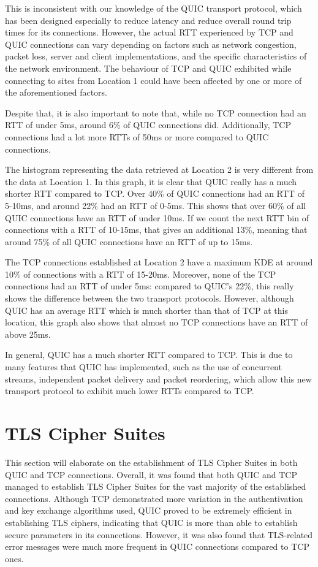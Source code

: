 \documentclass{l4proj}
\begin{document}
This is inconsistent with our knowledge of the QUIC transport protocol, which has been designed especially to reduce latency and reduce overall round trip times for its connections. However, the actual RTT experienced by TCP and QUIC connections can vary depending on factors such as network congestion, packet loss, server and client implementations, and the specific characteristics of the network environment. The behaviour of TCP and QUIC exhibited while connecting to sites from Location 1 could have been affected by one or more of the aforementioned factors.

Despite that, it is also important to note that, while no TCP connection had an RTT of under 5ms, around 6\% of QUIC connections did. Additionally, TCP connections had a lot more RTTs of 50ms or more compared to QUIC connections.

The histogram representing the data retrieved at Location 2 is very different from the data at Location 1. In this graph, it is clear that QUIC really has a much shorter RTT compared to TCP. Over 40\% of QUIC connections had an RTT of 5-10ms, and around 22\% had an RTT of 0-5ms. This shows that over 60\% of all QUIC connections have an RTT of under 10ms. If we count the next RTT bin of connections with a RTT of 10-15ms, that gives an additional 13\%, meaning that around 75\% of all QUIC connections have an RTT of up to 15ms.

The TCP connections established at Location 2 have a maximum KDE at around 10\% of connections with a RTT of 15-20ms. Moreover, none of the TCP connections had an RTT of under 5ms: compared to QUIC's 22\%, this really shows the difference between the two transport protocols. However, although QUIC has an average RTT which is much shorter than that of TCP at this location, this graph also shows that almost no TCP connections have an RTT of above 25ms. 

In general, QUIC has a much shorter RTT compared to TCP. This is due to many features that QUIC has implemented, such as the use of concurrent streams, independent packet delivery and packet reordering, which allow this new transport protocol to exhibit much lower RTTs compared to TCP.


\section{TLS Cipher Suites}

This section will elaborate on the establishment of TLS Cipher Suites in both QUIC and TCP connections. Overall, it was found that both QUIC and TCP managed to establish TLS Cipher Suites for the vast majority of the established connections. Although TCP demonstrated more variation in the authentivation and key exchange algorithms used, QUIC proved to be extremely efficient in establishing TLS ciphers, indicating that QUIC is more than able to establish secure parameters in its connections. However, it was also found that TLS-related error messages were much more frequent in QUIC connections compared to TCP ones.
\end{document}
